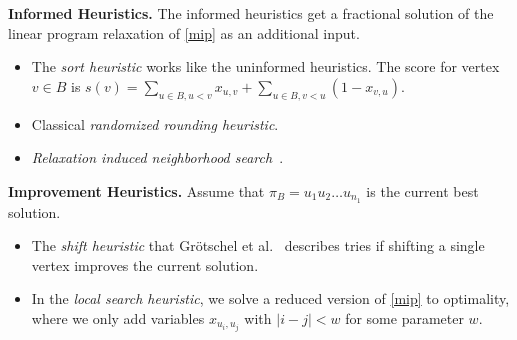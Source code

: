 \documentclass[a4paper,UKenglish,cleveref, autoref, thm-restate]{lipics-v2021}
\begin{document}
\noindent
\textbf{Informed Heuristics.}
The informed heuristics get a fractional solution of the linear program relaxation of \eqref{mip} as an additional input.
\begin{itemize}
\item The \emph{sort heuristic} works like the uninformed heuristics.
The score for vertex $v \in B$ is $s(v) = \sum_{u \in B, u < v} x_{u,v} + \sum_{u \in B, v < u} (1 - x_{v, u})$.
\item Classical \emph{randomized rounding heuristic}.
\item \emph{Relaxation induced neighborhood search}~\cite{danna2005exploring}.
\end{itemize}

\noindent
\textbf{Improvement Heuristics.}
Assume that $\pi_B = u_1u_2 \dots u_{n_1}$ is the current best solution.
\begin{itemize}
\item The \emph{shift heuristic} that Grötschel et al.~\cite{grotschel1984cutting} describes tries if shifting a single vertex improves the current solution.
\item In the \emph{local search heuristic}, we solve a reduced version of \eqref{mip} to optimality, where we only add variables $x_{u_i, u_j}$ with $|i-j| < w$ for some parameter $w$.
\end{itemize}
\end{document}
